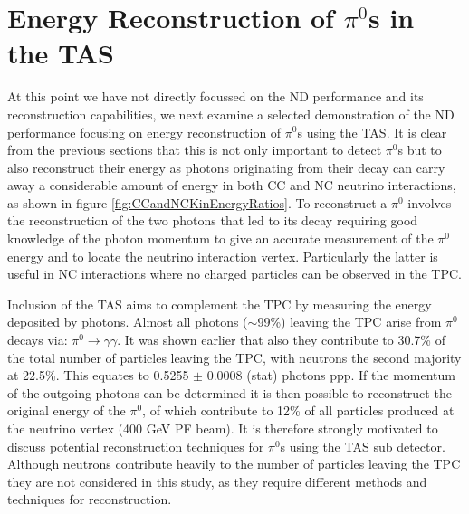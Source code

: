 %
%
\section{Energy Reconstruction of $\pi^{0}$s in the TAS}
At this point we have not directly focussed on the ND performance and its reconstruction capabilities, we next examine a selected demonstration of the ND performance focusing on energy reconstruction of $\pi^{0}$s using the TAS. It is clear from the previous sections that this is not only important to detect $\pi^{0}$s but to also reconstruct their energy as photons originating from their decay can carry away a considerable amount of energy in both CC and NC neutrino interactions, as shown in figure \ref{fig:CCandNCKinEnergyRatios}. To reconstruct a $\pi^{0}$ involves the reconstruction of the two photons that led to its decay requiring good knowledge of the photon momentum to give an accurate measurement of the $\pi^{0}$ energy and to locate the neutrino interaction vertex. Particularly the latter is useful in NC interactions where no charged particles can be observed in the TPC.

Inclusion of the TAS aims to complement the TPC by measuring the energy deposited by photons. Almost all photons ($\sim$99\%) leaving the TPC arise from $\pi^{0}$ decays via: $\pi^{0} \rightarrow \gamma \gamma$. It was shown earlier that also they contribute to 30.7\% of the total number of particles leaving the TPC, with neutrons the second majority at 22.5\%. This equates to 0.5255 $\pm$ 0.0008 (stat) photons ppp. If the momentum of the outgoing photons can be determined it is then possible to reconstruct the original energy of the $\pi^{0}$, of which contribute to 12\% of all particles produced at the neutrino vertex (400 GeV PF beam). It is therefore strongly motivated to discuss potential reconstruction techniques for $\pi^{0}$s using the TAS sub detector. Although neutrons contribute heavily to the number of particles leaving the TPC they are not considered in this study, as they require different methods and techniques for reconstruction. 

